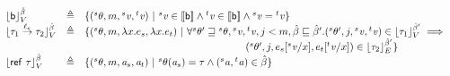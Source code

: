 
\begin{figure*}[!htbp]
  \centering
  \begin{displaymath}
    \begin{array}{lll}
      \fcUlrvn  {\tbase} & \triangleq & \{(\uWorlds, m,  \sval, \tval ) ~|~ \sval \in \llbracket \tbase \rrbracket \wedge
                                        \tval \in \llbracket \tbase \rrbracket \wedge \sval = \tval
                                        \} \\




      \fcUlrvn  {\tau_1 \fto \tau_2} & \triangleq & \{(\uWorlds,  m,  \lambda x. e_s, \lambda x. e_t)
                                                    ~|~ 
                        \forall \uWorlds' \wExtendsR \uWorlds,  \sval, \tval, j<m, \pb \wExtends \pb'.
                           (\uWorlds', j, \sval, \tval) \in \fclrvun {\tau_1} {\pb'}  \implies \\
                       & & \hspace{55mm} (\uWorlds', j, e_s[\sval/x], e_t[\tval/x]) \in \fclreun  {\tau_2} {\pb'}  \} \\

      \fcUlrvn  {\tref ~ \tau} & \triangleq & \{(\uWorlds, m, \loc_s, \loc_t) ~|~
                                              \uWorlds (\loc_s) = \tau \wedge ({^s}\loc, {^t}\loc) \in \pb \} \\


\end{array}
\end{displaymath}
\end{figure*}
